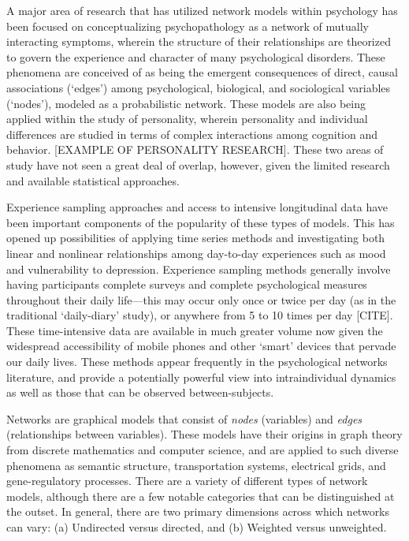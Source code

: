 A major area of research that has utilized network models within psychology has been focused on conceptualizing psychopathology as a network of mutually interacting symptoms, wherein the structure of their relationships are theorized to govern the experience and character of many psychological disorders. These phenomena are conceived of as being the emergent consequences of direct, causal associations (`edges') among psychological, biological, and sociological variables (`nodes'), modeled as a probabilistic network. These models are also being applied within the study of personality, wherein personality and individual differences are studied in terms of complex interactions among cognition and behavior. [EXAMPLE OF PERSONALITY RESEARCH]. These two areas of study have not seen a great deal of overlap, however, given the limited research and available statistical approaches. 

Experience sampling approaches and access to intensive longitudinal data have been important components of the popularity of these types of models. This has opened up possibilities of applying time series methods and investigating both linear and nonlinear relationships among day-to-day experiences such as mood and vulnerability to depression. Experience sampling methods generally involve having participants complete surveys and complete psychological measures throughout their daily life---this may occur only once or twice per day (as in the traditional `daily-diary' study), or anywhere from 5 to 10 times per day [CITE]. These time-intensive data are available in much greater volume now given the widespread accessibility of mobile phones and other `smart' devices that pervade our daily lives. These methods appear frequently in the psychological networks literature, and provide a potentially powerful view into intraindividual dynamics as well as those that can be observed between-subjects. 

Networks are graphical models that consist of \textit{nodes} (variables) and \textit{edges} (relationships between variables). These models have their origins in graph theory from discrete mathematics and computer science, and are applied to such diverse phenomena as semantic structure, transportation systems, electrical grids, and gene-regulatory processes. There are a variety of different types of network models, although there are a few notable categories that can be distinguished at the outset. In general, there are two primary dimensions across which networks can vary: (a) Undirected versus directed, and (b) Weighted versus unweighted. 

